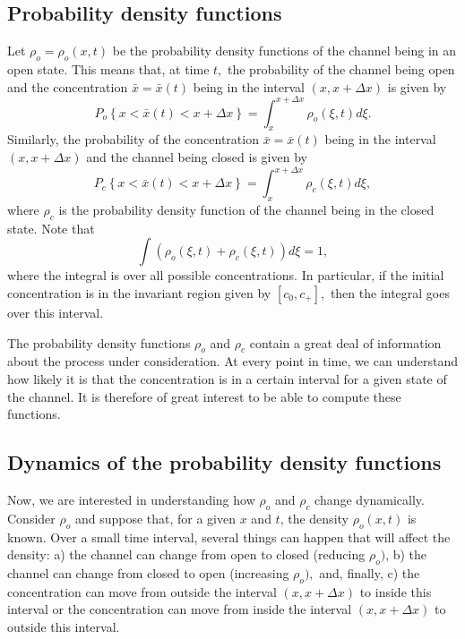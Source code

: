 \subsection{Probability density functions}

Let $\rho_{o}=\rho_{o}\left(  x,t\right)  $ be the probability density
functions of the channel being in an open state. This means that, at time $t,$
the probability of the channel being open and the concentration $\bar{x}
=\bar{x}(t)$ being in the interval $(x,x+\Delta x)$ is given by
\begin{equation}
P_{o}\left\{  x<\bar{x}(t)<x+\Delta x\right\}  =\int_{x}^{x+\Delta x}\rho
_{o}\left(  \xi,t\right)  d\xi. \label{probopen}
\end{equation}
Similarly, the probability of the concentration $\bar{x}=\bar{x}(t)$ being in
the interval $(x,x+\Delta x)$ and the channel being closed is given by
\begin{equation}
P_{c}\left\{  x<\bar{x}(t)<x+\Delta x\right\}  =\int_{x}^{x+\Delta x}\rho
_{c}\left(  \xi,t\right)  d\xi, \label{prob_closed}
\end{equation}
where $\rho_c$ is the probability density
function of the channel being in the closed state. Note that
\begin{equation}
\int\left(  \rho_{o}\left(  \xi,t\right)  +\rho_{c}\left(  \xi,t\right)
\right)  d\xi=1, \label{integral1}
\end{equation}
where the integral is over all possible concentrations. In particular, if the initial
concentration is in the invariant region given by $\left[  c_{0}
,c_{+}\right],$ then the integral goes over this interval.

The probability density functions $\rho_o$ and $\rho_c$ contain a great deal of information about the
process under consideration. At every point in time, we can understand how likely it is that the concentration is in a certain interval for a given state of the channel. 
It is therefore of great interest to be able to compute these functions.


\bigskip

\subsection{Dynamics of the probability density functions}

Now, we are interested in understanding how $\rho_{o}$ and $\rho_{c}$ change
dynamically. 
Consider $\rho_{o}$ and suppose that, for a given $x$ and $t$, the
density $\rho_{o}(x,t)$ is known. Over a small time interval, several things
can happen that will affect the density: a) the channel can change from open to
closed (reducing $\rho_{o})$, b) the channel can change from closed to open
(increasing $\rho_{o}),$ and, finally, c) the concentration can move from
outside the interval $(x,x+\Delta x)$ to inside this interval or the
concentration can move from inside the interval $(x,x+\Delta x)$ to outside
this interval.

